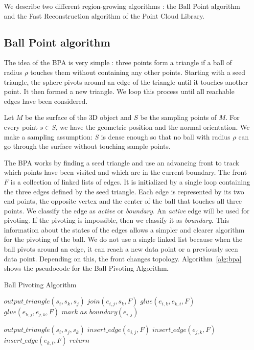 \documentclass[a4paper]{article}
\begin{document}
We describe two different region-growing algorithms : the Ball Point algorithm and the Fast Reconstruction algorithm of the Point Cloud Library.

\subsection{Ball Point algorithm}
The idea of the BPA is very simple : three points form a triangle if a ball of radius $\rho$ touches them without containing any other points. Starting with a seed triangle, the sphere pivots around an edge of the triangle until it touches another point. It then formed a new triangle. We loop this process until all reachable edges have been considered.

Let $M$ be the surface of the 3D object and $S$ be the sampling points of $M$. For every point $s \in S$, we have the geometric position and the normal orientation. We make a sampling assumption: $S$ is dense enough so that no ball with radius $\rho$ can go through the surface without touching sample points.


The BPA works by finding a seed triangle and use an advancing front to track which points have been visited and which are in the current boundary. The front $F$ is a collection of linked lists of edges. It is initialized by a single loop containing the three edges defined by the seed triangle. Each edge is represented by its two end points, the opposite vertex and the center of the ball that touches all three points. We classify the edge as \textit{active} or \textit{boundary}. An \textit{active} edge will be used for pivoting. If the pivoting is impossible, then we classify it as \textit{boundary}. This information about the states of the edges allows a simpler and clearer algorithm for the pivoting of the ball. We do not use a single linked list because when the ball pivots around an edge, it can reach a new data point or a previously seen data point. Depending on this, the front changes topology. Algorithm~\ref{alg:bpa} shows the pseudocode for the Ball Pivoting Algorithm.

\begin{algorithm}
\caption{Ball Pivoting Algorithm}
\label{alg:bpa}
\begin{algorithmic}[5]
      \State $output\_triangle(s_i, s_k, s_j)$
      \State $join(e_{i,j}, s_k, F)$
        \State $glue(e_{i,k}, e_{k,i}, F)$
      \EndIf
        \State $glue(e_{k,j}, e_{j,k}, F)$
      \EndIf
    \Else
      \State $mark\_as\_boundary(e_{i,j})$
    \EndIf
  \EndWhile

    \State $output\_triangle(s_i, s_j, s_k)$
    \State $insert\_edge(e_{i,j}, F)$
    \State $insert\_edge(e_{j,k}, F)$
    \State $insert\_edge(e_{k,i}, F)$
  \Else
    \State $return$
  \EndIf
\EndWhile
\end{algorithmic}
\end{algorithm} 
\end{document}
